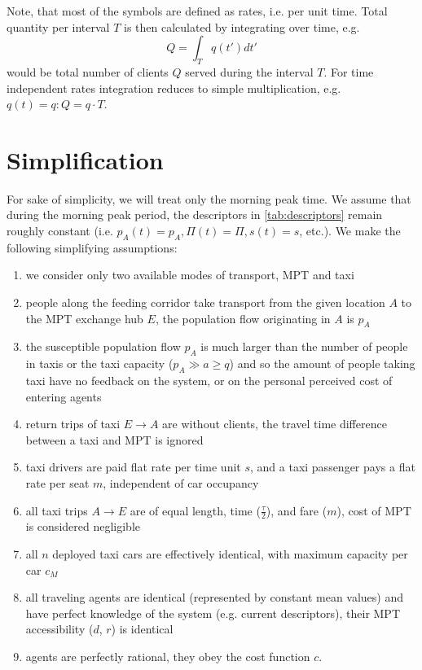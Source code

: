 \documentclass[a4paper]{report}
\newcommand\trip{$A\rightarrow{}E$}		%
\begin{document}
Note, that most of the symbols are defined as rates, i.e. per unit time. Total quantity per interval $T$ is then calculated by integrating over time, e.g. $$Q=\int_T q(t')dt'$$ would be total number of clients $Q$ served during the interval $T$. For time independent rates integration reduces to simple multiplication, e.g. $q(t)=q: Q=q\cdot T$. %

\section{Simplification}
\label{sec:simple}
For sake of simplicity, we will treat only the morning peak time. We assume that during the morning peak period, the descriptors in \autoref{tab:descriptors} remain roughly constant (i.e. $p_A(t)=p_A, \Pi(t)=\Pi, s(t)=s$, etc.). We make the following simplifying assumptions:
\begin{enumerate}
	\item we consider only two available modes of transport, MPT and taxi
	\item people along the feeding corridor take transport from the given location $A$ to the MPT exchange hub $E$, the population flow originating in $A$ is $p_A$
	\item the susceptible population flow $p_A$ is much larger than the number of people in taxis or the taxi capacity ($p_A\gg a \geq q$) and so the amount of people taking taxi have no feedback on the system, or on the personal perceived cost of entering agents
	\item return trips of taxi $E\rightarrow{} A$ are without clients, the travel time difference between a taxi and MPT is ignored
	\item taxi drivers are paid flat rate per time unit $s$, and a taxi passenger pays a flat rate per seat $m$, independent of car occupancy
	\item all taxi trips \trip{} are of equal length, time ($\frac{\tau}{2}$), and fare ($m$), cost of MPT is considered negligible
	\item all $n$ deployed taxi cars are effectively identical, with maximum capacity per car $c_M$
	\item all traveling agents are identical (represented by constant mean values) and have perfect knowledge of the system (e.g. current descriptors), their MPT accessibility ($d$, $r$) is identical 
	\item agents are perfectly rational, they obey the cost function $c$.
\end{enumerate}%
\end{document}

